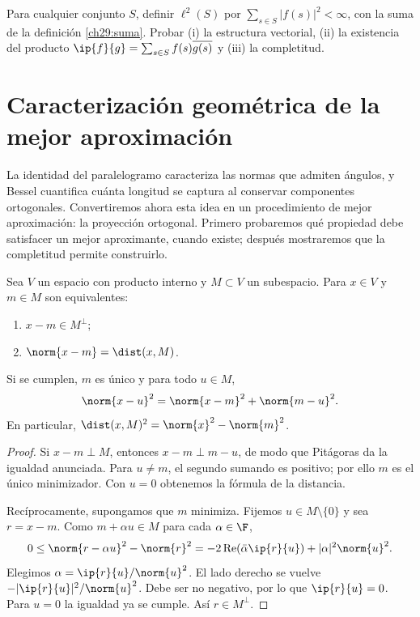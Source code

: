 \begin{ejercicio}\label{ej:lectura-29-8}
Para cualquier conjunto $S$, definir $\ell^{2}(S)$ por $\sum_{s\in S}|f(s)|^{2}<\infty$, con la suma de la definición \ref{ch29:suma}. Probar (i) la estructura vectorial, (ii) la existencia del producto $\ip{f}{g}=\sum_{s\in S}f(s)\overline{g(s)}$ y (iii) la completitud.
\end{ejercicio}


\section{Caracterización geométrica de la mejor aproximación}
\label{lectura:30}
La identidad del paralelogramo caracteriza las normas que admiten ángulos, y Bessel cuantifica cuánta longitud se captura al conservar componentes ortogonales. Convertiremos ahora esta idea en un procedimiento de mejor aproximación: la proyección ortogonal. Primero probaremos qué propiedad debe satisfacer un mejor aproximante, cuando existe; después mostraremos que la completitud permite construirlo.
\begin{teorema}\label{ch30:caracterizacion}
Sea $V$ un espacio con producto interno y $M\subset V$ un subespacio. Para $x\in V$ y $m\in M$ son equivalentes:
\begin{enumerate}[label=(\roman*)]
 \item $x-m\in M^{\perp}$;
 \item $\norm{x-m}=\dist(x,M)$.
\end{enumerate}
Si se cumplen, $m$ es único y para todo $u\in M$,
\[
 \norm{x-u}^{2}=\norm{x-m}^{2}+\norm{m-u}^{2}.
\]
En particular, $\dist(x,M)^{2}=\norm{x}^{2}-\norm{m}^{2}$.
\end{teorema}
\begin{proof}
Si $x-m\perp M$, entonces $x-m\perp m-u$, de modo que Pitágoras da la igualdad anunciada. Para $u\ne m$, el segundo sumando es positivo; por ello $m$ es el único minimizador. Con $u=0$ obtenemos la fórmula de la distancia.

Recíprocamente, supongamos que $m$ minimiza. Fijemos $u\in M\setminus\{0\}$ y sea $r=x-m$. Como $m+\alpha u\in M$ para cada $\alpha\in\F$,
\[
0\leq\norm{r-\alpha u}^{2}-\norm{r}^{2}
=-2\operatorname{Re}(\bar\alpha\ip{r}{u})+|\alpha|^{2}\norm{u}^{2}.
\]
Elegimos $\alpha=\ip{r}{u}/\norm{u}^{2}$. El lado derecho se vuelve $-|\ip{r}{u}|^{2}/\norm{u}^{2}$. Debe ser no negativo, por lo que $\ip{r}{u}=0$. Para $u=0$ la igualdad ya se cumple. Así $r\in M^{\perp}$.
\end{proof}

